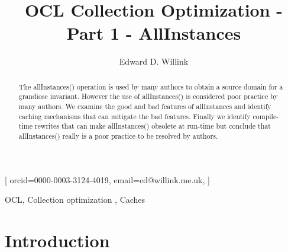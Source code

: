 \documentclass[
]{ceurart}
\begin{document}


\title{OCL Collection Optimization - Part 1 - AllInstances}

\author[1,2]{Edward D. Willink}[%
orcid=0000-0003-3124-4019,
email=ed@willink.me.uk,
]
\cormark[1]
\fnmark[1]
\address[1]{Willink Transformations Ltd, Reading England}
\address[2]{Eclipse Foundation}



\begin{abstract}
The allInstances() operation is used by many authors to obtain a source domain for a grandiose invariant. However the use of allInstances() is considered poor practice by many authors. We examine the good and bad features of allInstances and identify caching mechanisms that can mitigate the bad features. Finally we identify compile-time rewrites that can make allInstances() obsolete at run-time but conclude that allInstances() really is a poor practice to be resolved by authors.

\end{abstract}

\begin{keywords}
  OCL\sep
  Collection optimization \sep
  Caches
\end{keywords}

\maketitle

\section{Introduction}
\end{document}
